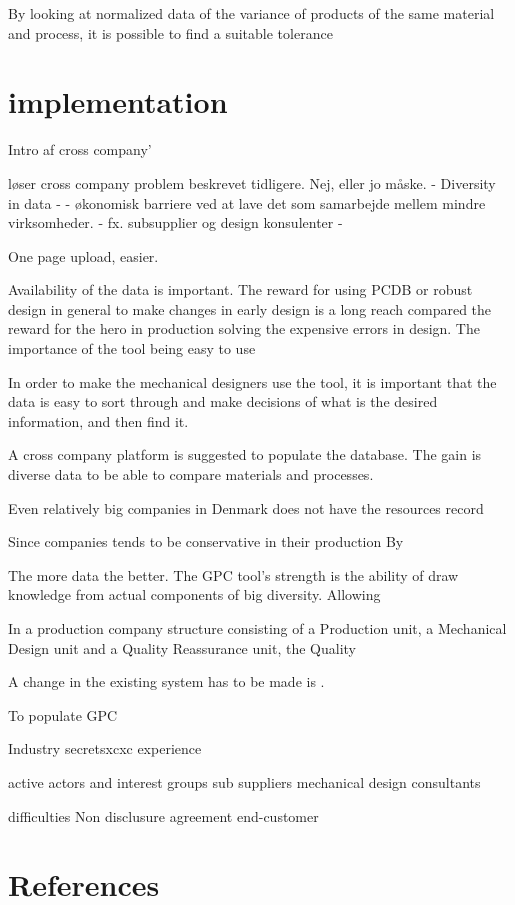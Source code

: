 \documentclass[aip,amsmath, reprint, author-year]{revtex4-1}
\begin{document}
By looking at normalized data of the variance of products of the same material and process, it is possible to find a suitable tolerance

\section{implementation}
Intro af cross company'

løser cross company problem beskrevet tidligere.
	Nej, eller jo måske.
	-  Diversity in data
	-  
	- økonomisk barriere ved at lave det som samarbejde mellem mindre virksomheder.	
		- fx. subsupplier og design konsulenter
	- 

One page upload, easier.


Availability of the data is important. The reward for using PCDB or robust design in general to make changes in early design is a long reach compared the reward for the hero in production solving the expensive errors in design. The importance of the tool being easy to use 

In order to make the mechanical designers use the tool, it is important that the data is easy to sort through and make decisions of what is the desired information, and then find it.


A cross company platform is suggested to populate the database. The gain is diverse data to be able to compare materials and processes. 

Even relatively big companies in Denmark does not have the resources record 

Since companies tends to be conservative in their production 
By 

The more data the better. The GPC tool's strength is the ability of draw knowledge from actual components of big diversity. Allowing  

In a production company structure consisting of a Production unit, a Mechanical Design unit and a Quality Reassurance unit, the Quality 

A change in the existing system has to be made is .
 

\cite{perzyk1998selection}

To populate GPC 

Industry secretsxcxc
	experience
	
	
active actors and interest groups
	sub suppliers 
	mechanical design consultants
	

difficulties
	Non disclusure agreement
	end-customer
	

\section*{References}

\end{document}
